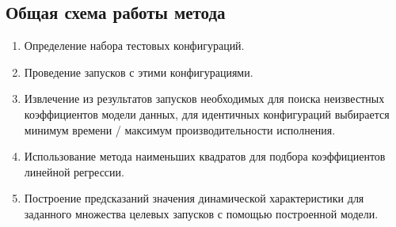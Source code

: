 	\subsection{Общая схема работы метода}
		\begin{enumerate}[I]
		\item Определение набора тестовых конфигураций.
		\item Проведение запусков с этими конфигурациями.
		\item Извлечение из результатов запусков необходимых для поиска неизвестных коэффициентов модели данных, для идентичных конфигураций выбирается минимум времени / максимум производительности исполнения.
		\item Использование метода наименьших квадратов для подбора коэффициентов линейной регрессии.
		\item Построение предсказаний значения динамической характеристики для заданного множества целевых запусков с помощью построенной модели.
		\end{enumerate}

\clearpage
